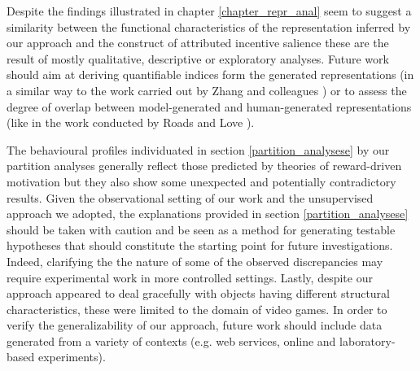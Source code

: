 Despite the findings illustrated in chapter \ref{chapter_repr_anal} seem to suggest a similarity between the functional characteristics of the representation inferred by our approach and the construct of attributed incentive salience these are the result of mostly qualitative, descriptive or exploratory analyses. Future work should aim at deriving quantifiable indices form the generated representations (in a similar way to the work carried out by Zhang and colleagues \cite{zhang2009neural}) or to assess the degree of overlap between model-generated and human-generated representations (like in the work conducted by Roads and Love \cite{roads2021enriching}).

The behavioural profiles individuated in section \ref{partition_analysese} by our partition analyses generally reflect those predicted by theories of reward-driven motivation \cite{thorndike1927law,skinner1965science,berridge2004motivation} but they also show some unexpected and potentially contradictory results. Given the observational setting of our work and the unsupervised approach we adopted, the explanations provided in section \ref{partition_analysese} should be taken with caution and be seen as a method for generating testable hypotheses that should constitute the starting point for future investigations. Indeed, clarifying the the nature of some of the observed discrepancies may require experimental work in more controlled settings. Lastly, despite our approach appeared to deal gracefully with objects having different structural characteristics, these were limited to the domain of video games. In order to verify the generalizability of our approach, future work should include data generated from a variety of contexts (e.g. web services, online and laboratory-based experiments).  

